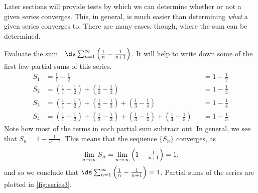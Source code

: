 Later sections will provide tests by which we can determine whether or not a given series converges. This, in general, is much easier than determining \emph{what} a given series converges to. There are many cases, though, where the sum can be determined.

\begin{example}\label{ex_series3}
Evaluate the sum~~$\ds \sum_{n=1}^\infty \left(\frac1n-\frac1{n+1}\right)$.
\solution
It will help to write down some of the first few partial sums of this series.
\begin{align*}
S_1 &=	\frac11-\frac12 & & = 1-\frac12\\
S_2 &=	\left(\frac11-\frac12\right) + \left(\frac12-\frac13\right) & & = 1-\frac13\\
S_3 &=	\left(\frac11-\frac12\right) + \left(\frac12-\frac13\right)+\left(\frac13-\frac14\right) & &= 1-\frac14\\
S_4 &=	\left(\frac11-\frac12\right) + \left(\frac12-\frac13\right)+\left(\frac13-\frac14\right) +\left(\frac14-\frac15\right)& &= 1-\frac15
\end{align*}
%
%
%
Note how most of the terms in each partial sum subtract out. In general, we see that $S_n = 1-\frac{1}{n+1}$. This means that the sequence $\{S_n\}$ converges,  as
\[\lim_{n\to\infty}S_n=\smallskip\lim_{n\to\infty}\left(1-\tfrac1{n+1}\right)=1,\]
and so we conclude that $\ds\sum_{n=1}^\infty \left(\tfrac1n-\tfrac1{n+1}\right) = 1$. Partial sums of the series are plotted in \autoref{fig:series3}.
\end{example}

